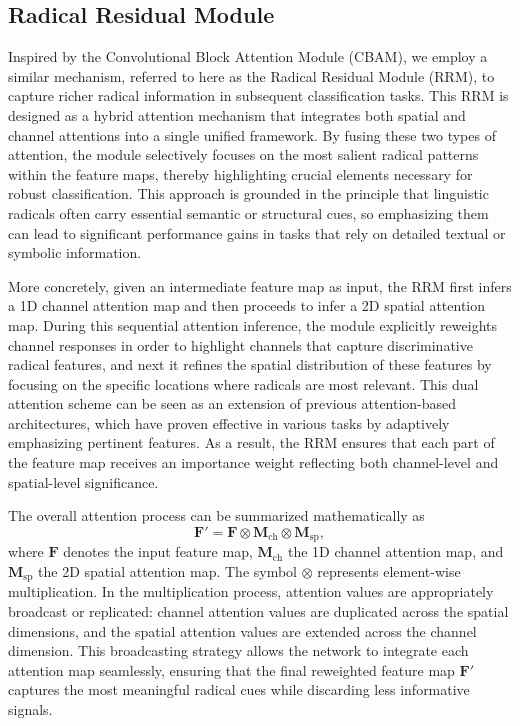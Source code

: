 \subsection{Radical Residual Module}

Inspired by the Convolutional Block Attention Module (CBAM)\cite{woo2018cbam}, we employ a similar mechanism, referred to here as the Radical Residual Module (RRM), to capture richer radical information in subsequent classification tasks. This RRM is designed as a hybrid attention mechanism that integrates both spatial and channel attentions into a single unified framework. By fusing these two types of attention, the module selectively focuses on the most salient radical patterns within the feature maps, thereby highlighting crucial elements necessary for robust classification. This approach is grounded in the principle that linguistic radicals often carry essential semantic or structural cues, so emphasizing them can lead to significant performance gains in tasks that rely on detailed textual or symbolic information.

More concretely, given an intermediate feature map as input, the RRM first infers a 1D channel attention map and then proceeds to infer a 2D spatial attention map. During this sequential attention inference, the module explicitly reweights channel responses in order to highlight channels that capture discriminative radical features, and next it refines the spatial distribution of these features by focusing on the specific locations where radicals are most relevant. This dual attention scheme can be seen as an extension of previous attention-based architectures, which have proven effective in various tasks by adaptively emphasizing pertinent features\cite{hu2018squeeze,vaswani2017attention}. As a result, the RRM ensures that each part of the feature map receives an importance weight reflecting both channel-level and spatial-level significance.

The overall attention process can be summarized mathematically as
\[
\mathbf{F}' = \mathbf{F} \otimes \mathbf{M}_\text{ch} \otimes \mathbf{M}_\text{sp},
\]
where \(\mathbf{F}\) denotes the input feature map, \(\mathbf{M}_\text{ch}\) the 1D channel attention map, and \(\mathbf{M}_\text{sp}\) the 2D spatial attention map. The symbol \(\otimes\) represents element-wise multiplication. In the multiplication process, attention values are appropriately broadcast or replicated: channel attention values are duplicated across the spatial dimensions, and the spatial attention values are extended across the channel dimension. This broadcasting strategy allows the network to integrate each attention map seamlessly, ensuring that the final reweighted feature map \(\mathbf{F}'\) captures the most meaningful radical cues while discarding less informative signals.

